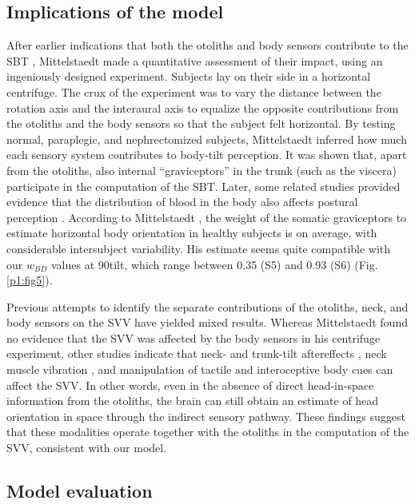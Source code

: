 \subsection{Implications of the model}
 
After earlier indications that both the otoliths and body sensors contribute to the SBT \cite{clark1963, nelson1968}, Mittelstaedt \citeyear{mittelstaedt1997} made a quantitative assessment of their impact, using an ingeniously designed experiment. Subjects lay on their side in a horizontal centrifuge. The crux of the experiment was to vary the distance between the rotation axis and the interaural axis to equalize the opposite contributions from the otoliths and the body sensors so that the subject felt horizontal. By testing normal, paraplegic, and nephrectomized subjects, Mittelstaedt inferred how much each sensory system contributes to body-tilt perception. It was shown that, apart from the otoliths, also internal ``graviceptors'' in the trunk (such as the viscera) participate in the computation of the SBT. Later, some related studies provided evidence that the distribution of blood in the body also affects postural perception \cite{vaitl1997, vaitl2002}. According to Mittelstaedt \citeyear{mittelstaedt1998}, the weight of the somatic graviceptors to estimate horizontal body orientation in healthy subjects is  on average, with considerable intersubject variability. His estimate seems quite compatible with our $w_{BD}$ values at 90\mydegree tilt, which range between 0.35 (S5) and 0.93 (S6) (Fig. \ref{p1:fig5}). 

Previous attempts to identify the separate contributions of the otoliths, neck, and body sensors on the SVV have yielded mixed results. Whereas Mittelstaedt \citeyear{mittelstaedt1998} found no evidence that the SVV was affected by the body sensors in his centrifuge experiment, other studies indicate that neck- and trunk-tilt aftereffects \cite{wade1968}, neck muscle vibration \cite{mckenna2004}, and manipulation of tactile and interoceptive body cues \cite{trousselard2004} can affect the SVV. In other words, even in the absence of direct head-in-space information from the otoliths, the brain can still obtain an estimate of head orientation in space through the indirect sensory pathway. These findings suggest that these modalities operate together with the otoliths in the computation of the SVV, consistent with our model. 


\subsection{Model evaluation}
 
